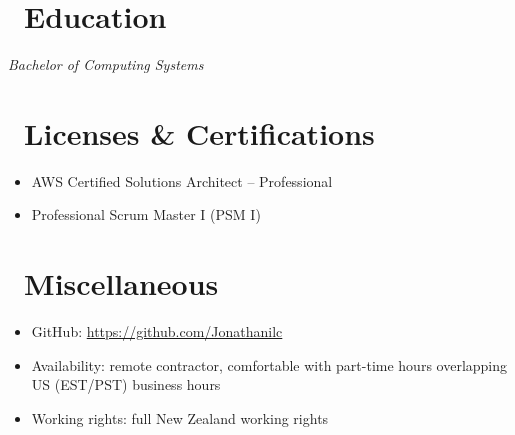 \documentclass{resume}
\begin{document}
\section{\faGraduationCap\ Education}
\textit{Bachelor of Computing Systems}

\section{\faHeartO\ Licenses \& Certifications}
\begin{itemize}[parsep=0.5ex]
  \item AWS Certified Solutions Architect – Professional
  \item Professional Scrum Master I (PSM I)
\end{itemize}

\section{\faInfo\ Miscellaneous}
\begin{itemize}[parsep=0.5ex]
  \item GitHub: \url{https://github.com/Jonathanilc}
  \item Availability: remote contractor, comfortable with part-time hours overlapping US (EST/PST) business hours
  \item Working rights: full New Zealand working rights
\end{itemize}
\end{document}
